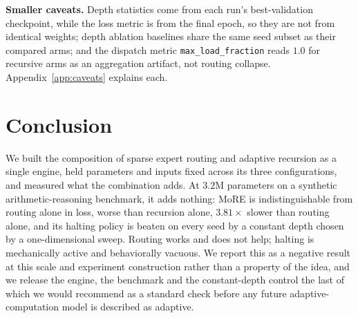 \documentclass{article}
\begin{document}
\textbf{Smaller caveats.} Depth statistics come from each run's best-validation checkpoint, while the loss metric is from the final epoch, so they are not from identical weights; depth ablation baselines share the same seed subset as their compared arms; and the dispatch metric \texttt{max\_load\_fraction} reads $1.0$ for recursive arms as an aggregation artifact, not routing collapse. Appendix~\ref{app:caveats} explains each.

\section{Conclusion}
\label{sec:conclusion}

We built the composition of sparse expert routing and adaptive recursion as a
single engine, held parameters and inputs fixed across its three
configurations, and measured what the combination adds. At $3.2$M parameters on
a synthetic arithmetic-reasoning benchmark, it adds nothing: MoRE is
indistinguishable from routing alone in loss, worse than recursion alone,
$3.81\times$ slower than routing alone, and its halting policy is beaten on
every seed by a constant depth chosen by a one-dimensional sweep. Routing
works and does not help; halting is mechanically active and behaviorally
vacuous. We report this as a negative result at this scale and experiment construction rather than a
property of the idea, and we release the engine, the benchmark and the
constant-depth control the last of which we would recommend as a standard
check before any future adaptive-computation model is described as adaptive.




\newpage

\end{document}
